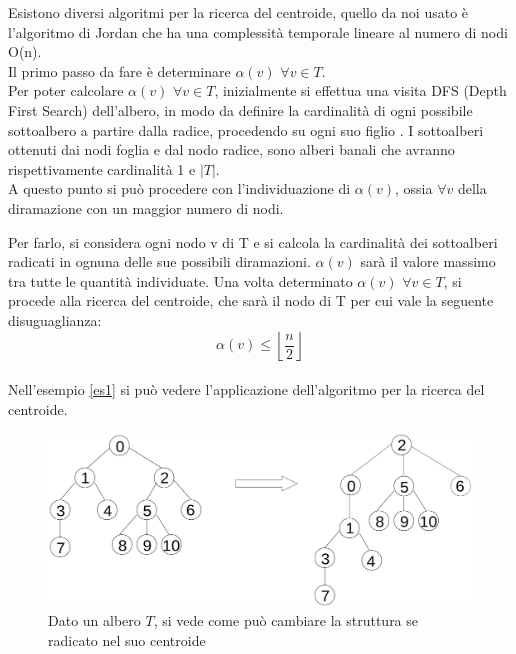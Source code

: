 Esistono diversi algoritmi per la ricerca del centroide, quello da noi usato \`e l'algoritmo di Jordan \cite{jordan1869assemblages} che  ha una complessit\`a temporale lineare al numero di nodi O(n). \\
Il primo passo da fare \`e determinare $\alpha(v)$ $\forall v \in T$.\\
Per poter calcolare $\alpha(v)$ $\forall v \in T$, inizialmente si effettua una visita DFS (Depth First Search) dell'albero, in modo da definire la cardinalit\`a di ogni possibile sottoalbero a partire dalla radice, procedendo su ogni suo figlio .
I sottoalberi ottenuti dai nodi foglia e dal nodo radice, sono alberi banali che avranno rispettivamente cardinalit\`a 1 e $|T|$. \\
A questo punto si pu\`o procedere con l'individuazione di $\alpha (v)$, ossia $\forall v$ della diramazione con un maggior numero di nodi.

Per farlo, si considera ogni nodo v di T e si calcola la cardinalit\`a dei sottoalberi radicati in ognuna delle sue possibili diramazioni. 
$\alpha (v)$ sar\`a il valore massimo tra tutte le quantit\`a individuate.
Una volta determinato $\alpha(v)$ $\forall v \in T$, si procede alla ricerca del centroide, che sar\`a il nodo di T per cui vale la seguente disuguaglianza:
\begin{equation*}
\alpha(v) \le \left\lfloor\frac{n}{2} \right\rfloor
\end{equation*}\mbox{}\\
Nell'esempio \ref{es1} si pu\`o vedere l'applicazione dell'algoritmo per la ricerca del centroide.\mbox{}\\

	\begin{figure}[htbp]
		\centering
		\includegraphics[width=11.5cm]{capitolo3/grafo1}
		\caption{Dato un albero $ T $, si vede come pu\`o cambiare la struttura se radicato nel suo centroide}
		\label{fig:2}
\end{figure}

